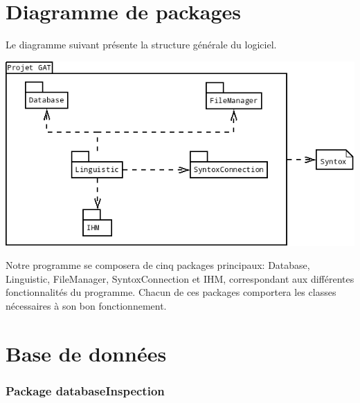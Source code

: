 \documentclass[12pt]{report}
\begin{document}
	



\section{Diagramme de packages}
Le diagramme suivant présente la structure générale du logiciel.

\begin{center}
\includegraphics[scale=0.45]{DiagPackages.png}
\end{center}


Notre programme se composera de cinq packages principaux: Database, Linguistic, FileManager, SyntoxConnection et IHM, correspondant aux différentes fonctionnalités du programme.
Chacun de ces packages comportera les classes nécessaires à son bon fonctionnement.






\section{Base de données}

\subsubsection*{Package databaseInspection}
\end{document}
